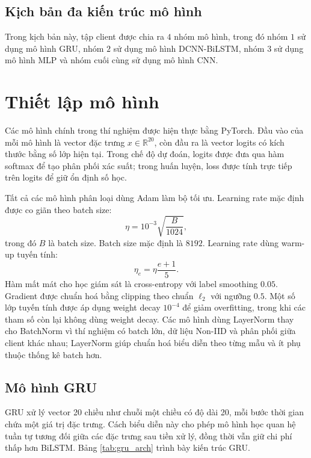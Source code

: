 \subsection{Kịch bản đa kiến trúc mô hình}
Trong kịch bản này, tập client được chia ra $4$ nhóm mô hình, trong đó nhóm $1$ sử dụng mô hình GRU, nhóm $2$ sử dụng mô hình DCNN-BiLSTM, nhóm $3$ sử dụng mô hình MLP và nhóm cuối cùng sử dụng mô hình CNN.


\section{Thiết lập mô hình}
\label{sec:model_setup}

Các mô hình chính trong thí nghiệm được hiện thực bằng PyTorch. Đầu vào của mỗi mô hình là vector đặc trưng $x\in\mathbb{R}^{20}$, còn đầu ra là vector logits có kích thước bằng số lớp hiện tại. Trong chế độ dự đoán, logits được đưa qua hàm softmax để tạo phân phối xác suất; trong huấn luyện, loss được tính trực tiếp trên logits để giữ ổn định số học.

Tất cả các mô hình phân loại dùng Adam làm bộ tối ưu. Learning rate mặc định được co giãn theo batch size:
\[
\eta=10^{-3}\sqrt{\frac{B}{1024}},
\]
trong đó $B$ là batch size. Batch size mặc định là $8192$. Learning rate dùng warm-up tuyến tính:
\[
\eta_e=\eta\frac{e+1}{5}.
\]
Hàm mất mát cho học giám sát là cross-entropy với label smoothing $0.05$. Gradient được chuẩn hoá bằng clipping theo chuẩn $\ell_2$ với ngưỡng $0.5$. Một số lớp tuyến tính được áp dụng weight decay $10^{-4}$ để giảm overfitting, trong khi các tham số còn lại không dùng weight decay. Các mô hình dùng LayerNorm thay cho BatchNorm vì thí nghiệm có batch lớn, dữ liệu Non-IID và phân phối giữa client khác nhau; LayerNorm giúp chuẩn hoá biểu diễn theo từng mẫu và ít phụ thuộc thống kê batch hơn.

\subsection{Mô hình GRU}
\label{sec:gru_arch}

GRU \cite{kasongo2023gru} xử lý vector 20 chiều như chuỗi một chiều có độ dài 20, mỗi bước thời gian chứa một giá trị đặc trưng. Cách biểu diễn này cho phép mô hình học quan hệ tuần tự tương đối giữa các đặc trưng sau tiền xử lý, đồng thời vẫn giữ chi phí thấp hơn BiLSTM. Bảng \ref{tab:gru_arch} trình bày kiến trúc GRU.

